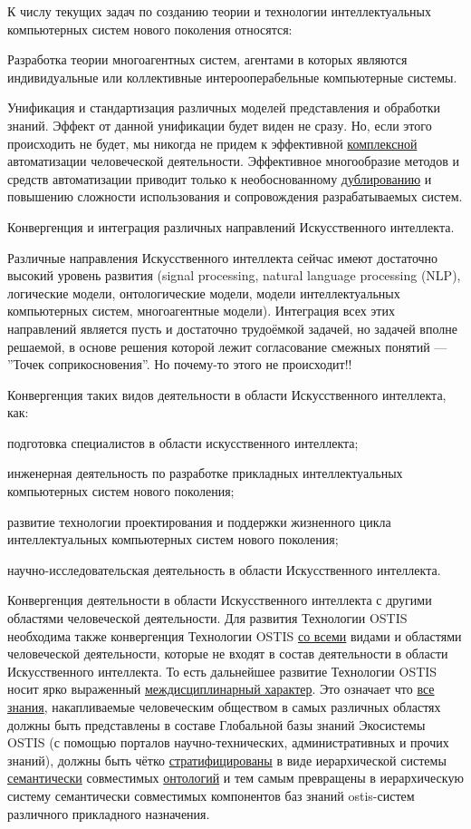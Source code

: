 К числу текущих задач по созданию теории и технологии интеллектуальных компьютерных систем нового поколения относятся:
\begin{textitemize}
	\item Разработка теории многоагентных систем, агентами в которых являются индивидуальные или коллективные интерооперабельные компьютерные системы.
	\item Унификация и стандартизация различных моделей представления и обработки знаний. Эффект от данной унификации будет виден не сразу. Но, если этого происходить не будет, мы никогда не придем к эффективной \uline{комплексной} автоматизации человеческой деятельности. Эффективное многообразие методов и средств автоматизации приводит только к необоснованному \uline{дублированию} и повышению сложности использования и сопровождения разрабатываемых систем.
	\item Конвергенция и интеграция различных направлений Искусственного интеллекта.
	\item Различные направления Искусственного интеллекта сейчас имеют достаточно высокий уровень развития (signal processing, natural language processing (NLP), логические модели, онтологические модели, модели интеллектуальных компьютерных систем, многоагентные модели). Интеграция всех этих направлений является пусть и достаточно трудоёмкой задачей, но задачей вполне решаемой, в основе решения которой лежит согласование смежных понятий --- ''Точек соприкосновения''. Но почему-то этого не происходит!!
	\item Конвергенция таких видов деятельности в области Искусственного интеллекта, как:
	\begin{textitemize}
		\item подготовка специалистов в области искусственного интеллекта;
		\item инженерная деятельность по разработке прикладных интеллектуальных компьютерных систем нового поколения;
		\item развитие технологии проектирования и поддержки жизненного цикла интеллектуальных компьютерных систем нового поколения;
		\item научно-исследовательская деятельность в области Искусственного интеллекта.
	\end{textitemize}
	\item Конвергенция деятельности в области Искусственного интеллекта с другими областями человеческой деятельности. Для развития Технологии OSTIS необходима также конвергенция Технологии OSTIS \uline{со всеми} видами и областями человеческой деятельности, которые не входят в состав деятельности в области Искусственного интеллекта. То есть дальнейшее развитие Технологии OSTIS носит ярко выраженный \uline{междисциплинарный характер}. Это означает что \uline{все знания}, накапливаемые человеческим обществом в самых различных областях должны быть представлены в составе Глобальной базы знаний Экосистемы OSTIS (с помощью порталов научно-технических, административных и прочих знаний), должны быть чётко \uline{стратифицированы} в виде иерархической системы \uline{семантически} совместимых \uline{онтологий} и тем самым превращены в иерархическую систему семантически совместимых компонентов баз знаний ostis-систем различного прикладного назначения.

\end{textitemize}
